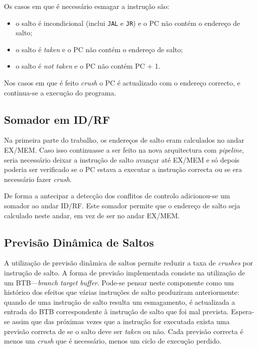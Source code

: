 \documentclass[a4paper]{article}
\begin{document}
	Os casos em que é necessário esmagar a instrução são:
	
	\begin{itemize}
		\item o salto é incondicional (inclui  \texttt{JAL} e \texttt{JR}) e o PC não contém o endereço de salto;
		\item o salto é \textit{taken} e o PC não contém o endereço de salto;
		\item o salto é \textit{not taken} e o PC não contém PC + 1.
	\end{itemize}

	Nos casos em que é feito \textit{crush} o PC é actualizado com o endereço correcto, e continua-se a execução do programa.
	

	\subsection{Somador em ID/RF}
	
	Na primeira parte do trabalho, os endereços de salto eram calculados no andar EX/MEM. Caso isso continuasse a ser feito na nova arquitectura com \textit{pipeline}, seria necessário deixar a instrução de salto avançar até EX/MEM e só depois poderia ser verificado se o PC estava a executar a instrução correcta ou se era necessário fazer \textit{crush}.
	
	De forma a antecipar a detecção dos conflitos de controlo adicionou-se um somador ao andar ID/RF. Este somador permite que o endereço de salto seja calculado neste andar, em vez de ser no andar EX/MEM.
	
	\subsection{Previsão Dinâmica de Saltos}
	
	A utilização de previsão dinâmica de saltos permite reduzir a taxa de \textit{crushes} por instrução de salto. A forma de previsão implementada consiste na utilização de um BTB---\textit{branch target buffer}. Pode-se pensar neste componente como um histórico dos efeitos que várias instruções de salto produziram anteriormente: quando de uma instrução de salto resulta um esmagamento, é actualizada a entrada do BTB correspondente à instrução de salto que foi mal prevista. Espera-se assim que das próximas vezes que a instrução for executada exista uma previsão correcta de se o salto deve ser \textit{taken} ou não. Cada previsão correcta é menos um \textit{crush} que é necessário, menos um ciclo de execução perdido.
	
\end{document}
